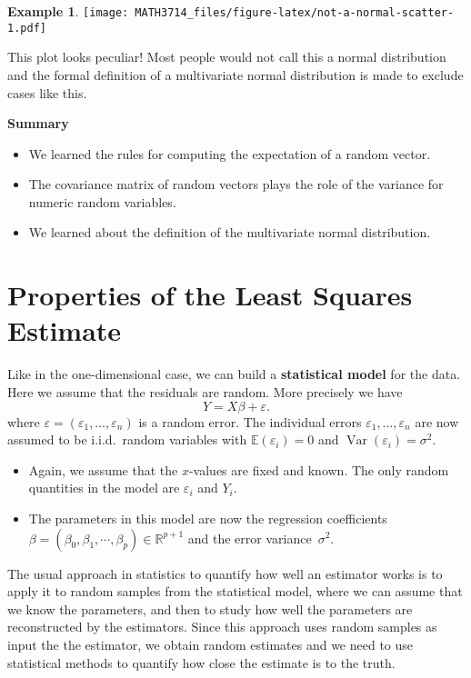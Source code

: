 \documentclass[
  a4paper,
]{article}
\providecommand{\tightlist}{%
  \setlength{\itemsep}{0pt}\setlength{\parskip}{0pt}}
\theoremstyle{definition}
\theoremstyle{definition}
\newtheorem{example}{Example}[section]
\theoremstyle{definition}
\theoremstyle{definition}
\theoremstyle{remark}
\begin{document}
\begin{example}
\texttt{[image: MATH3714\_files/figure-latex/not-a-normal-scatter-1.pdf]}

This plot looks peculiar! Most people would not call this a normal distribution
and the formal definition of a multivariate normal distribution is made to
exclude cases like this.
\end{example}

\textbf{Summary}

\begin{itemize}
\tightlist
\item
  We learned the rules for computing the expectation of a random vector.
\item
  The covariance matrix of random vectors plays the role of the
  variance for numeric random variables.
\item
  We learned about the definition of the multivariate normal distribution.
\end{itemize}

\clearpage

\hypertarget{S04-model}{%
\section{Properties of the Least Squares Estimate}\label{S04-model}}

Like in the one-dimensional case, we can build a \textbf{statistical model}
for the data. Here we assume that the residuals are random. More
precisely we have
\begin{equation}
  Y = X \beta + \varepsilon.  \label{eq:lmstats}
\end{equation}
where \(\varepsilon= (\varepsilon_1, \ldots, \varepsilon_n)\) is a random error.
The individual errors \(\varepsilon_1, \ldots, \varepsilon_n\)
are now assumed to be i.i.d.~random variables with \(\mathbb{E}(\varepsilon_i) = 0\) and
\(\mathop{\mathrm{Var}}(\varepsilon_i) = \sigma^2\).

\begin{itemize}
\item
  Again, we assume that the \(x\)-values are fixed and known. The only
  random quantities in the model are \(\varepsilon_i\) and \(Y_i\).
\item
  The parameters in this model are now the regression coefficients
  \(\beta = (\beta_0, \beta_1, \cdots, \beta_p) \in \mathbb{R}^{p+1}\) and
  the error variance~\(\sigma^2\).
\end{itemize}

The usual approach in statistics to quantify how well an estimator works
is to apply it to random samples from the statistical model, where we
can assume that we know the parameters, and then to study how well the
parameters are reconstructed by the estimators. Since this approach
uses random samples as input the the estimator, we obtain random estimates
and we need to use statistical methods to quantify how close the estimate
is to the truth.
\end{document}
